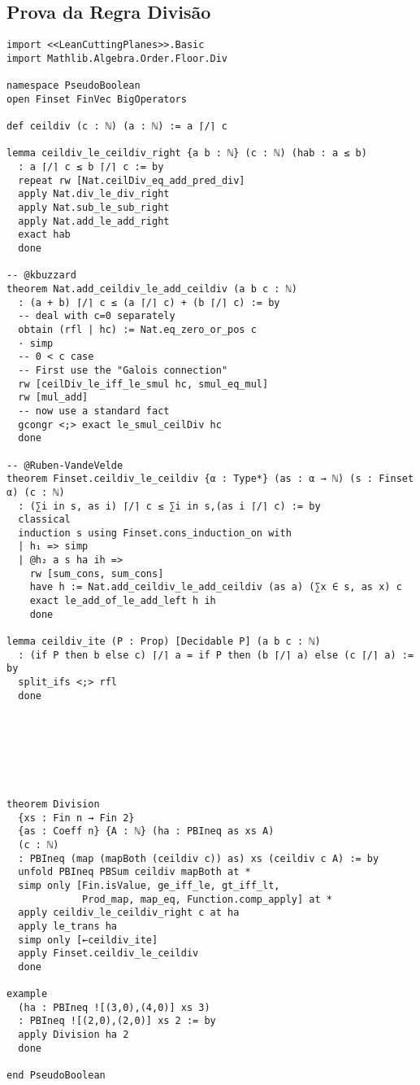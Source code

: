 \documentclass[conference]{IEEEtran}
\begin{document}
\subsection{Prova da Regra Divisão}
\begin{verbatim}
import <<LeanCuttingPlanes>>.Basic
import Mathlib.Algebra.Order.Floor.Div

namespace PseudoBoolean
open Finset FinVec BigOperators

def ceildiv (c : ℕ) (a : ℕ) := a ⌈/⌉ c

lemma ceildiv_le_ceildiv_right {a b : ℕ} (c : ℕ) (hab : a ≤ b)
  : a ⌈/⌉ c ≤ b ⌈/⌉ c := by
  repeat rw [Nat.ceilDiv_eq_add_pred_div]
  apply Nat.div_le_div_right
  apply Nat.sub_le_sub_right
  apply Nat.add_le_add_right
  exact hab
  done

-- @kbuzzard
theorem Nat.add_ceildiv_le_add_ceildiv (a b c : ℕ)
  : (a + b) ⌈/⌉ c ≤ (a ⌈/⌉ c) + (b ⌈/⌉ c) := by
  -- deal with c=0 separately
  obtain (rfl | hc) := Nat.eq_zero_or_pos c
  · simp
  -- 0 < c case
  -- First use the "Galois connection"
  rw [ceilDiv_le_iff_le_smul hc, smul_eq_mul]
  rw [mul_add]
  -- now use a standard fact
  gcongr <;> exact le_smul_ceilDiv hc
  done

-- @Ruben-VandeVelde
theorem Finset.ceildiv_le_ceildiv {α : Type*} (as : α → ℕ) (s : Finset α) (c : ℕ)
  : (∑i in s, as i) ⌈/⌉ c ≤ ∑i in s,(as i ⌈/⌉ c) := by
  classical
  induction s using Finset.cons_induction_on with
  | h₁ => simp
  | @h₂ a s ha ih =>
    rw [sum_cons, sum_cons]
    have h := Nat.add_ceildiv_le_add_ceildiv (as a) (∑x ∈ s, as x) c
    exact le_add_of_le_add_left h ih
    done

lemma ceildiv_ite (P : Prop) [Decidable P] (a b c : ℕ)
  : (if P then b else c) ⌈/⌉ a = if P then (b ⌈/⌉ a) else (c ⌈/⌉ a) := by
  split_ifs <;> rfl
  done







theorem Division
  {xs : Fin n → Fin 2}
  {as : Coeff n} {A : ℕ} (ha : PBIneq as xs A)
  (c : ℕ)
  : PBIneq (map (mapBoth (ceildiv c)) as) xs (ceildiv c A) := by
  unfold PBIneq PBSum ceildiv mapBoth at *
  simp only [Fin.isValue, ge_iff_le, gt_iff_lt,
             Prod_map, map_eq, Function.comp_apply] at *
  apply ceildiv_le_ceildiv_right c at ha
  apply le_trans ha
  simp only [←ceildiv_ite]
  apply Finset.ceildiv_le_ceildiv
  done

example
  (ha : PBIneq ![(3,0),(4,0)] xs 3)
  : PBIneq ![(2,0),(2,0)] xs 2 := by
  apply Division ha 2
  done

end PseudoBoolean

\end{verbatim}
\newpage
\end{document}
